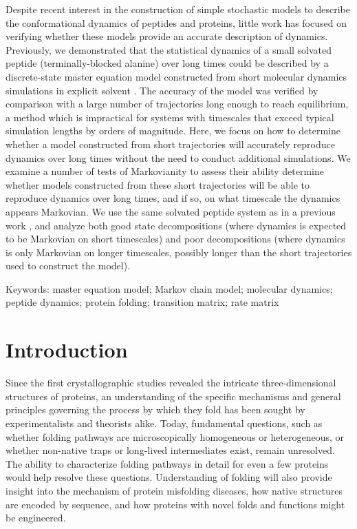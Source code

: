 Despite recent interest in the construction of simple stochastic models to describe the conformational dynamics of peptides and proteins, little work has focused on verifying whether these models provide an accurate description of dynamics.
Previously, we demonstrated that the statistical dynamics of a small solvated peptide (terminally-blocked alanine) over long times could be described by a discrete-state master equation model constructed from short molecular dynamics simulations in explicit solvent \cite{chodera:mms:2006}.  
The accuracy of the model was verified by comparison with a large number of trajectories long enough to reach equilibrium, a method which is impractical for systems with timescales that exceed typical simulation lengths by orders of magnitude.
Here, we focus on how to determine whether a model constructed from short trajectories will accurately reproduce dynamics over long times without the need to conduct additional simulations.
We examine a number of tests of Markovianity to assess their ability determine whether models constructed from these short trajectories will be able to reproduce dynamics over long times, and if so, on what timescale the dynamics appears Markovian.
We use the same solvated peptide system as in a previous work \cite{chodera:mms:2006}, and analyze both good state decompositions (where dynamics is expected to be Markovian on short timescales) and poor decompositions (where dynamics is only Markovian on longer timescales, possibly longer than the short trajectories used to construct the model).

Keywords: master equation model; Markov chain model; molecular dynamics; peptide dynamics; protein folding; transition matrix; rate matrix

\section{Introduction}

Since the first crystallographic studies revealed the intricate three-dimensional structures of proteins, an understanding of the specific mechanisms and general principles governing the process by which they fold has been sought by experimentalists and theorists alike.
Today, fundamental questions, such as whether folding pathways are microscopically homogeneous or heterogeneous, or whether non-native traps or long-lived intermediates exist, remain unresolved.
The ability to characterize folding pathways in detail for even a few proteins would help resolve these questions.
Understanding of folding will also provide insight into the mechanism of protein misfolding diseases, how native structures are encoded by sequence, and how proteins with novel folds and functions might be engineered.

